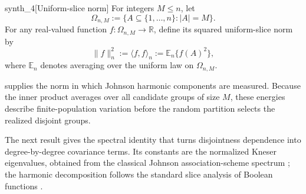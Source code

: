 \documentclass[11pt]{article}
\begin{document}
\begin{definitionv}{synth_4}[Uniform-slice norm]
For integers \(M \le n\), let
\[
\Omega_{n,M}:=\{A\subseteq \{1,\ldots,n\}: |A|=M\}.
\]
For any real-valued function \(f:\Omega_{n,M}\to\mathbb R\), define its squared uniform-slice norm by
\[
\|f\|_n^2
:=
\langle f,f\rangle_n
:=
\mathbb E_n\{f(A)^2\},
\]
where \(\mathbb E_n\) denotes averaging over the uniform law on \(\Omega_{n,M}\).
\end{definitionv}

 supplies the norm in which Johnson harmonic components are measured. Because the inner product averages over all candidate groups of size \(M\), these energies describe finite-population variation before the random partition selects the realized disjoint groups.

The next result gives the spectral identity that turns disjointness dependence into degree-by-degree covariance terms. Its constants are the normalized Kneser eigenvalues, obtained from the classical Johnson association-scheme spectrum \citep{Delsarte1973,BrouwerCohenNeumaier1989,BrouwerEtAl2018}; the harmonic decomposition follows the standard slice analysis of Boolean functions \citep{Filmus2016}.
\end{document}
